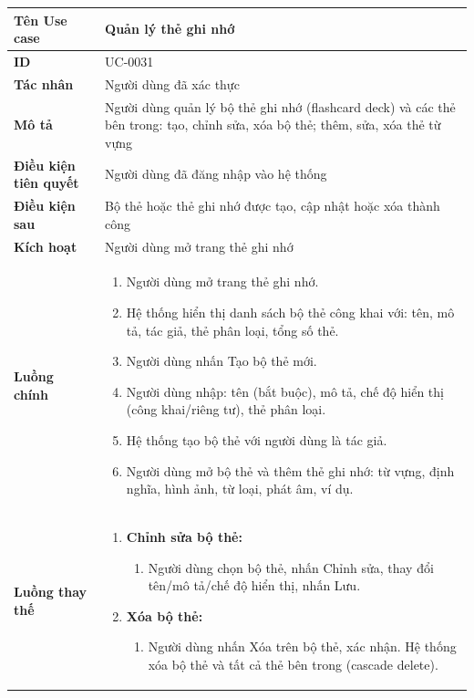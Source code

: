 {
\small
\renewcommand{\arraystretch}{1.15}

\begin{tabularx}{\textwidth}{|>{\raggedright\arraybackslash}p{3.5cm}|>{\raggedright\arraybackslash}X|}
\hline
\textbf{Tên Use case} & Quản lý thẻ ghi nhớ \\
\hline
\textbf{ID} & UC-0031 \\
\hline
\textbf{Tác nhân} & Người dùng đã xác thực \\
\hline
\textbf{Mô tả} & Người dùng quản lý bộ thẻ ghi nhớ (flashcard deck) và các thẻ bên trong: tạo, chỉnh sửa, xóa bộ thẻ; thêm, sửa, xóa thẻ từ vựng \\
\hline
\textbf{Điều kiện tiên quyết} & Người dùng đã đăng nhập vào hệ thống \\
\hline
\textbf{Điều kiện sau} & Bộ thẻ hoặc thẻ ghi nhớ được tạo, cập nhật hoặc xóa thành công \\
\hline
\textbf{Kích hoạt} & Người dùng mở trang thẻ ghi nhớ \\
\hline
\textbf{Luồng chính} &
\begin{enumerate}
    \item Người dùng mở trang thẻ ghi nhớ.
    \item Hệ thống hiển thị danh sách bộ thẻ công khai với: tên, mô tả, tác giả, thẻ phân loại, tổng số thẻ.
    \item Người dùng nhấn Tạo bộ thẻ mới.
    \item Người dùng nhập: tên (bắt buộc), mô tả, chế độ hiển thị (công khai/riêng tư), thẻ phân loại.
    \item Hệ thống tạo bộ thẻ với người dùng là tác giả.
    \item Người dùng mở bộ thẻ và thêm thẻ ghi nhớ: từ vựng, định nghĩa, hình ảnh, từ loại, phát âm, ví dụ.
\end{enumerate} \\
\hline
\textbf{Luồng thay thế} &
\begin{enumerate}
    \item \textbf{Chỉnh sửa bộ thẻ:}
    \begin{enumerate}
        \item[3A.] Người dùng chọn bộ thẻ, nhấn Chỉnh sửa, thay đổi tên/mô tả/chế độ hiển thị, nhấn Lưu.
    \end{enumerate}
    \item \textbf{Xóa bộ thẻ:}
    \begin{enumerate}
        \item[3B.] Người dùng nhấn Xóa trên bộ thẻ, xác nhận. Hệ thống xóa bộ thẻ và tất cả thẻ bên trong (cascade delete).

\end{enumerate}
\end{enumerate}
\end{tabularx}}
